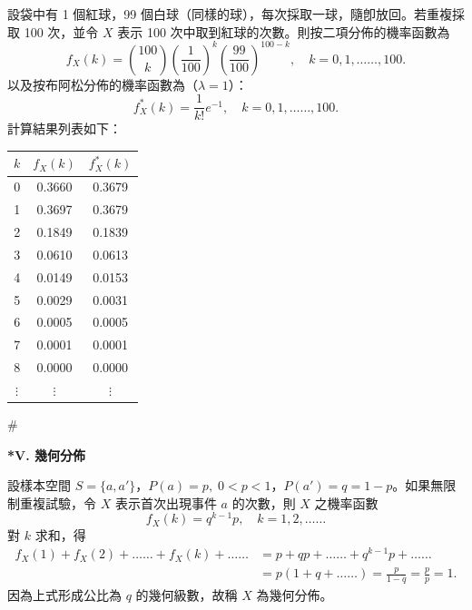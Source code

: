 \medskip
\begin{example}[*]\label{ex:b5-5-7}
設袋中有 1 個紅球，99 個白球（同樣的球），每次採取一球，隨卽放回。若重複採取 100 次，並令 $X$ 表示 100 次中取到紅球的次數。則按二項分佈的機率函數為
\[
f_X(k) = \binom{100}{k} \left(\frac{1}{100}\right)^k \left(\frac{99}{100}\right)^{100-k}, \quad k = 0, 1, \dots\dots, 100.
\]
以及按布阿松分佈的機率函數為（$\lambda = 1$）：
\[
f_X^*(k) = \frac{1}{k!} e^{-1}, \quad k = 0, 1, \dots\dots, 100.
\]
計算結果列表如下：

\begin{center}
\renewcommand{\arraystretch}{1.2}
\begin{tabular}{c|c|c}
\hline\hline
$k$ & $f_X(k)$ & $f_X^*(k)$\footnotemark \\
\hline
0 & 0.3660 & 0.3679 \\
1 & 0.3697 & 0.3679 \\
2 & 0.1849 & 0.1839 \\
3 & 0.0610 & 0.0613 \\
4 & 0.0149 & 0.0153 \\
5 & 0.0029 & 0.0031 \\
6 & 0.0005 & 0.0005 \\
7 & 0.0001 & 0.0001 \\
8 & 0.0000 & 0.0000 \\
$\vdots$ & $\vdots$ & $\vdots$ \\
\hline\hline
\end{tabular}
\end{center}
\label{note:b5-ch5-p150-fxstar}
\end{example}
\hfill $\#$

\medskip
\noindent\textbf{*V. 幾何分佈}

設樣本空間 $S = \{a, a'\}$，$P(a) = p, \; 0 < p < 1$，$P(a') = q = 1 - p$。如果無限制重複試驗，令 $X$ 表示首次出現事件 $a$ 的次數，則 $X$ 之機率函數
\begin{equation}
f_X(k) = q^{k-1} p, \quad k = 1, 2, \dots\dots \label{eq:b5-ch5-4}
\end{equation}
對 $k$ 求和，得
\begin{align*}
f_X(1) + f_X(2) + \dots\dots + f_X(k) + \dots\dots &= p + qp + \dots\dots + q^{k-1} p + \dots\dots \\
&= p(1 + q + \dots\dots) = \frac{p}{1 - q} = \frac{p}{p} = 1.
\end{align*}
因為上式形成公比為 $q$ 的幾何級數，故稱 $X$ 為幾何分佈。

